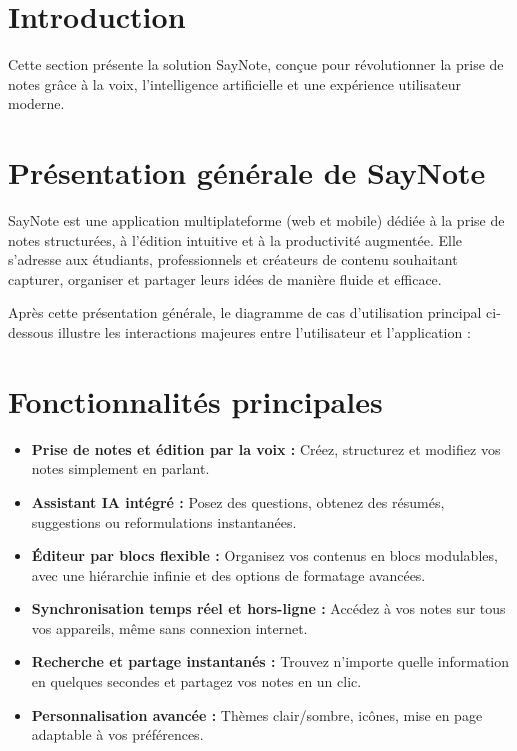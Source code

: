 
\section*{Introduction}
Cette section présente la solution SayNote, conçue pour révolutionner la prise de notes grâce à la voix, l’intelligence artificielle et une expérience utilisateur moderne.

\section{Présentation générale de SayNote}
SayNote est une application multiplateforme (web et mobile) dédiée à la prise de notes structurées, à l’édition intuitive et à la productivité augmentée. Elle s’adresse aux étudiants, professionnels et créateurs de contenu souhaitant capturer, organiser et partager leurs idées de manière fluide et efficace.

Après cette présentation générale, le diagramme de cas d’utilisation principal ci-dessous illustre les interactions majeures entre l’utilisateur et l’application :

\section{Fonctionnalités principales}
\begin{itemize}
    \item \textbf{Prise de notes et édition par la voix :} Créez, structurez et modifiez vos notes simplement en parlant.
    \item \textbf{Assistant IA intégré :} Posez des questions, obtenez des résumés, suggestions ou reformulations instantanées.
    \item \textbf{Éditeur par blocs flexible :} Organisez vos contenus en blocs modulables, avec une hiérarchie infinie et des options de formatage avancées.
    \item \textbf{Synchronisation temps réel et hors-ligne :} Accédez à vos notes sur tous vos appareils, même sans connexion internet.
    \item \textbf{Recherche et partage instantanés :} Trouvez n’importe quelle information en quelques secondes et partagez vos notes en un clic.
    \item \textbf{Personnalisation avancée :} Thèmes clair/sombre, icônes, mise en page adaptable à vos préférences.
\end{itemize}

